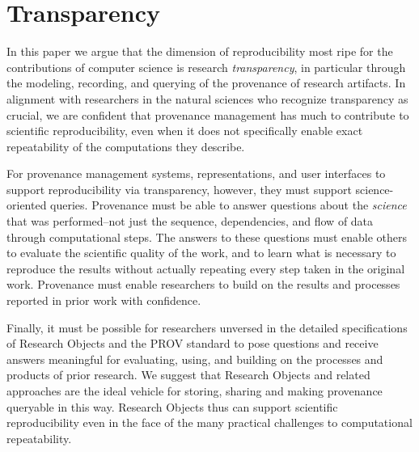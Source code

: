 \section{Transparency}

In this paper we argue that the dimension of reproducibility most ripe for the contributions of computer science
	is research \emph{transparency}, in particular through the modeling, recording, and querying of the provenance of research artifacts.
In alignment with researchers in the natural sciences who recognize transparency as crucial,
	we are confident that provenance management has much to contribute to scientific reproducibility,
	 even when it does not specifically enable exact repeatability of the computations they describe.

For provenance management systems, representations, and user interfaces to support reproducibility via transparency,
	however, they must support science-oriented queries.
Provenance must be able to answer questions about the \emph{science} that was performed--not just the
	sequence, dependencies, and flow of data through computational steps.
The answers to these questions must enable others to evaluate the scientific quality of the work, and to learn what is necessary to
	reproduce the results without actually repeating every step taken in the original work.
Provenance must enable researchers to build on the results and processes reported in prior work with confidence.

Finally, it must be possible for researchers unversed in the detailed specifications of Research Objects and the PROV standard
	to pose questions and receive answers meaningful for evaluating, using, and building on the
	processes and products of prior research.
We suggest that Research Objects and related approaches are the ideal vehicle for storing, sharing and making
	provenance queryable in this way.
Research Objects thus can support scientific reproducibility even in the face of the many practical challenges to
	computational repeatability.
